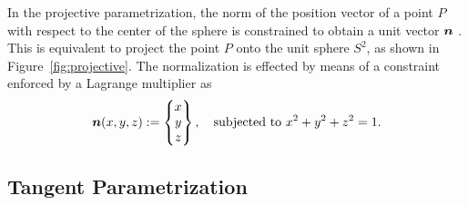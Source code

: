 \documentclass[12pt]{article}
\numberwithin{equation}{section}
\begin{document}
In the projective parametrization, the norm of the position vector of
a point $P$ with respect to the center of the sphere is constrained to
obtain a unit vector ${\boldsymbol{n}}$ \citep{Ortiz.Leroy.Needleman:1986}. This is
equivalent to project the point $P$ onto the unit sphere $S^2$, as
shown in Figure~\ref{fig:projective}.  The normalization is effected
by means of a constraint enforced by a Lagrange multiplier as
\begin{equation}
  {\boldsymbol{n}}(x,y,z)
  := 
  \begin{Bmatrix}
    x
    \\
    y
    \\
    z
  \end{Bmatrix},
  \quad
  \text{subjected to}~x^2+y^2+z^2 = 1.
\end{equation}

\subsection{Tangent Parametrization}
\label{subsec:tangent}
\end{document}
